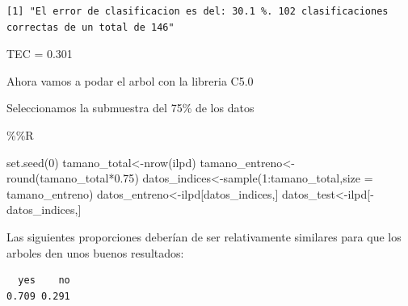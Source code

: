 \documentclass[
  11pt,
  a4paper,
]{article}
\newenvironment{Shaded}{\begin{snugshade}}{\end{snugshade}}
\newcommand{\AttributeTok}[1]{\textcolor[rgb]{0.77,0.63,0.00}{#1}}
\newcommand{\DecValTok}[1]{\textcolor[rgb]{0.00,0.00,0.81}{#1}}
\newcommand{\FloatTok}[1]{\textcolor[rgb]{0.00,0.00,0.81}{#1}}
\newcommand{\FunctionTok}[1]{\textcolor[rgb]{0.00,0.00,0.00}{#1}}
\newcommand{\NormalTok}[1]{#1}
\newcommand{\OtherTok}[1]{\textcolor[rgb]{0.56,0.35,0.01}{#1}}
\newcommand{\SpecialCharTok}[1]{\textcolor[rgb]{0.00,0.00,0.00}{#1}}
\begin{document}
\begin{verbatim}
[1] "El error de clasificacion es del: 30.1 %. 102 clasificaciones correctas de un total de 146"
\end{verbatim}

TEC = 0.301

\vspace{1cm}

Ahora vamos a podar el arbol con la libreria C5.0

Seleccionamos la submuestra del 75\% de los datos

\begin{Shaded}
\begin{Highlighting}[]
\SpecialCharTok{\%\%}\NormalTok{R}

\FunctionTok{set.seed}\NormalTok{(}\DecValTok{0}\NormalTok{)}
\NormalTok{tamano\_total}\OtherTok{\textless{}{-}}\FunctionTok{nrow}\NormalTok{(ilpd)}
\NormalTok{tamano\_entreno}\OtherTok{\textless{}{-}}\FunctionTok{round}\NormalTok{(tamano\_total}\SpecialCharTok{*}\FloatTok{0.75}\NormalTok{)}
\NormalTok{datos\_indices}\OtherTok{\textless{}{-}}\FunctionTok{sample}\NormalTok{(}\DecValTok{1}\SpecialCharTok{:}\NormalTok{tamano\_total,}\AttributeTok{size =}\NormalTok{ tamano\_entreno)}
\NormalTok{datos\_entreno}\OtherTok{\textless{}{-}}\NormalTok{ilpd[datos\_indices,]}
\NormalTok{datos\_test}\OtherTok{\textless{}{-}}\NormalTok{ilpd[}\SpecialCharTok{{-}}\NormalTok{datos\_indices,]}
\end{Highlighting}
\end{Shaded}

Las siguientes proporciones deberían de ser relativamente similares para
que los arboles den unos buenos resultados:

\begin{Shaded}
\end{Shaded}

\begin{verbatim}
  yes    no 
0.709 0.291 
\end{verbatim}

\begin{Shaded}
\end{Shaded}
\end{document}
